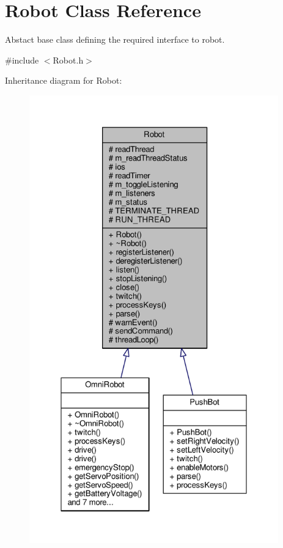 \hypertarget{class_robot}{}\section{Robot Class Reference}
\label{class_robot}


Abstact base class defining the required interface to robot.  




{\ttfamily \#include $<$Robot.\+h$>$}



Inheritance diagram for Robot\+:
\nopagebreak
\begin{figure}[H]
\begin{center}
\leavevmode
\includegraphics[height=550pt]{class_robot__inherit__graph}
\end{center}
\end{figure}


